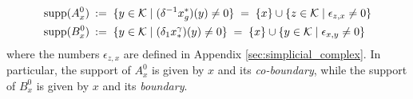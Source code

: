 \documentclass[a4paper,12pt,twoside,reqno]{amsart}
\theoremstyle{plain}
\theoremstyle{definition}
\theoremstyle{remark}
\numberwithin{equation}{section}
\numberwithin{figure}{section}
\numberwithin{table}{section}
\newcommand{\f}[1]{\mathcal{#1}}
\begin{document}
	
	
	
	
	
	
	
	\[
	\begin{aligned}
		{\rm supp}(A_x^0)\:&:=\; \{y\in\f{K}\;|\;(\delta^{-1}x^*_g)(y)\neq 0\}\;=\;\{x\}\cup \{z\in\f{K}\;|\; \epsilon_{z,x}\neq 0\}\\
		{\rm supp}(B_x^0)\:&:=\; \{y\in\f{K}\;|\;(\delta_{1}x_*^\gamma)(y)\neq 0\}\;=\;\{x\}\cup \{y\in\f{K}\;|\; \epsilon_{x,y}\neq 0\}
	\end{aligned}
	\] 
	where the numbers $\epsilon_{z,x}$ are defined in Appendix \ref{sec:simplicial_complex}.
	In particular, the support of $A_x^0$ is given by $x$ and its \emph{co-boundary}, while the support of $B_x^0$ is given by $x$ and its \emph{boundary}.
	
	
	
	
	
	
	
\end{document}
